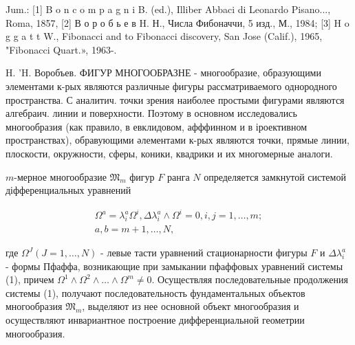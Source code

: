 \documentclass[10pt]{article}
\begin{document}
Jum.: [1] B o n c o m p a g n i B. (ed.), Illiber Abbaci di Leonardo Pisano..., Roma, 1857, [2] В о р о б ь е в H. Н., Числа Фибоначчи, 5 изд., М., 1984; [3] H o g g a t t W., Fibonacci and to Fibonacci discovery, San Jose (Calif.), 1965, "Fibonacci Quart.», 1963-.



H. 'H. Воробъев. ФИГУР МНОГООБРАЗНЕ - многообразие, образующими элементами к-рых являются различные фигуры рассматриваемого однородного пространства. С аналитич. точки зрения наиболее простыми фигурами являются алгебраич. линии и поверхности. Поэтому в основном исследовались многообразия (как правило, в евклидовом, афффинном и в іроективном пространствах), обравующими әлементами к-рых являются точки, прямые линии, плоскости, окружности, сферы, коники, квадрики и их многомерные аналоги.



$m$-мерное многообразие $\mathfrak{M}_{m}$ фигур $F$ ранга $N$ определяется замкнутой системой діфференциальных уравнений



\[

\begin{gathered}

\Omega^{a}=\lambda_{i}^{a} \Omega^{i}, \Delta \lambda_{i}^{a} \wedge \Omega^{i}=0, i, j=1, \ldots, m ; \\

a, b=m+1, \ldots, N,

\end{gathered}

\]



где $\Omega^{J}(J=1, \ldots, N)$ - левые тасти уравнений стационарности фигуры $F$ и $\Delta \lambda_{i}^{a}$ - формы Пфаффа, возникающие при замыкании пфаффовых уравнений системы (1), причем $\Omega^{1} \wedge \Omega^{2} \wedge \ldots \wedge \Omega^{m} \neq 0$. Осуществляя последовательные продолжения системы (1), получают последовательность фундаментальных объектов многообразия $\mathfrak{M}_{m}$, выделяют из нее основной объект многообразия и осуществляют инвариантное построение дифференциальной геометрии многообразия.
\end{document}
